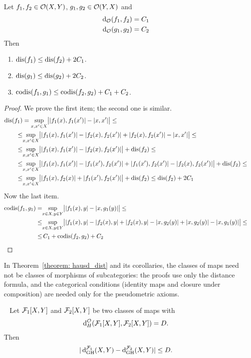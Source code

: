 \begin{lemma}\label{lemma:dis for close functions}
    Let $f_1, f_2 \in \mathcal{O}(X,Y)$, $g_1, g_2 \in \mathcal{O}(Y,X)$ and
    \begin{align*}
      \operatorname{d}_{\mathcal{O}}(f_1, f_2) = C_1 \\
      \operatorname{d}_{\mathcal{O}}(g_1, g_2) = C_2
    \end{align*}
    Then
    \begin{enumerate}
      \item $\operatorname{dis}(f_1) \leq \operatorname{dis}(f_2) + 2C_1$.
      \item $\operatorname{dis}(g_1) \leq \operatorname{dis}(g_2) + 2C_2$.
      \item $\operatorname{codis}(f_1, g_1) \leq \operatorname{codis}(f_2, g_2) + C_1 + C_2$.
    \end{enumerate}
\end{lemma}
  \begin{proof}
    We prove the first item; the second one is similar.
    \begin{align*}
      \operatorname{dis}(f_1) &= \underset{x, x' \in X}{\sup} \bigl||f_1(x), f_1(x')| - |x,x'|\bigr| \leq \\
      \leq &
      \underset{x, x' \in X}{\sup} \bigl||f_1(x), f_1(x')| - |f_2(x), f_2(x')| + |f_2(x), f_2(x')|  - |x,x'|\bigr| 
      \leq \\
      \leq&
      \underset{x, x' \in X}{\sup} \bigl||f_1(x), f_1(x')| -  |f_2(x), f_2(x')| \bigr| + \operatorname{dis}(f_2)
      \leq \\
      \leq &
      \underset{x, x' \in X}{\sup} \bigl||f_1(x), f_1(x')| - |f_1(x'), f_2(x')| + |f_1(x'), f_2(x')| -  |f_2(x), f_2(x')| \bigr| + \operatorname{dis}(f_2)
      \leq \\
      \leq &
      \underset{x, x' \in X}{\sup} \bigl||f_1(x), f_2(x)| + |f_1(x'), f_2(x')| \bigr| + \operatorname{dis}(f_2) 
      \leq
      \operatorname{dis}(f_2) + 2C_1  
    \end{align*}
    Now the last item.
    \begin{align*}
      \operatorname{codis}(f_1, g_1) = & \underset{x \in X, y \in Y}{\sup} \bigl||f_1(x), y| - |x, g_1(y)|\bigr| \leq \\
      \leq &
      \underset{x \in X, y \in Y}{\sup} \bigl||f_1(x), y| - |f_2(x), y| + |f_2(x), y| - |x, g_2(y)| + |x, g_2(y)| - |x, g_1(y)|\bigr| 
      \leq \\
      \leq &
      \, C_1 + \operatorname{codis}(f_2, g_2) + C_2
    \end{align*}
  \end{proof}
In Theorem~\ref{theorem: hausd_dist} and its corollaries, the classes of maps need not be classes of morphisms of subcategories: the proofs use only the distance formula, and the categorical conditions (identity maps and closure under composition) are needed only for the pseudometric axioms.
\begin{theorem}~\label{theorem: hausd_dist}
  Let $\mathcal{F}_1[X,Y]$ and $\mathcal{F}_2[X,Y]$ be two classes of maps with
  $$
  \operatorname{d}_{H}^{\mathcal{O}}(\mathcal{F}_1[X,Y], \mathcal{F}_2[X,Y]) = D.
  $$
  Then
  $$
    |\operatorname{d}^{\mathcal{F}_1}_{\mathrm{GH}}(X,Y) - \operatorname{d}^{\mathcal{F}_2}_{\mathrm{GH}}(X,Y)| \le D.
  $$
\end{theorem}

